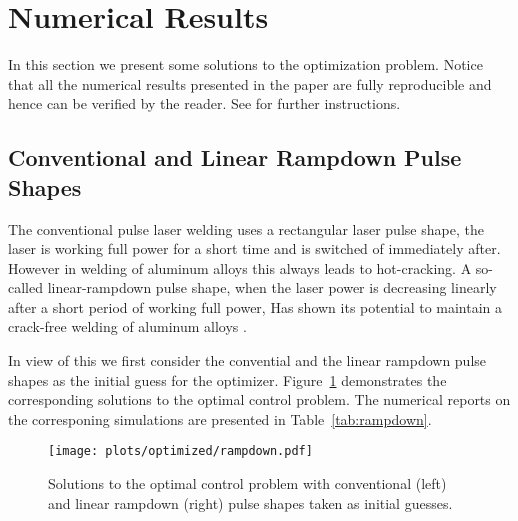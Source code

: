 

\section{Numerical Results}
\label{sec:numericals}

In this section we present some solutions to the optimization problem. Notice that all the numerical results presented in the paper are fully reproducible and hence can be verified by the reader. See \cite{optcontrol_github} for further instructions. 

\subsection{Conventional and Linear Rampdown Pulse Shapes}

The conventional pulse laser welding uses a rectangular laser pulse shape, \ie the laser is working full power for a short time and is switched of immediately after. However in welding of aluminum alloys this always leads to hot-cracking. A so-called linear-rampdown pulse shape, \ie when the laser power is decreasing linearly after a short period of working full power, Has shown its potential to maintain a crack-free welding of aluminum alloys .

In view of this we first consider the convential and the linear rampdown pulse shapes as the initial guess for the optimizer. Figure~\ref{fig:rampdown} demonstrates the corresponding solutions to the optimal control problem. The numerical reports on the corresponing simulations are presented in Table~\ref{tab:rampdown}.

\begin{figure} \label{fig:rampdown}
	\centering
	\texttt{[image: plots/optimized/rampdown.pdf]}
	\caption{Solutions to the optimal control problem with conventional (left) and linear rampdown (right) pulse shapes taken as initial guesses.}
\end{figure}

